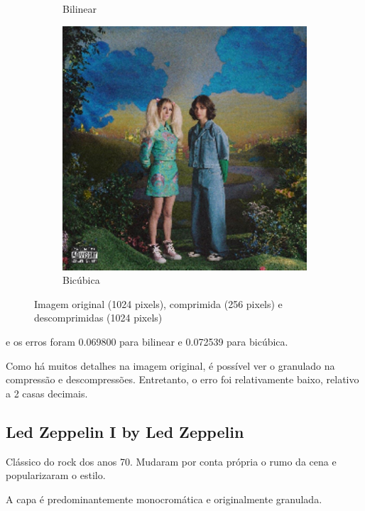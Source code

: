 \documentclass{article}
\begin{document}
\begin{figure}[ht]
\begin{subfigure}{0.48\textwidth}
    \caption{Bilinear}
  \end{subfigure}%
  \hfill
  \begin{subfigure}{0.48\textwidth}
    \centering
    \includegraphics[width=\textwidth]{imagens-reais/not-tight/decompressed-bicubica.png}
    \caption{Bicúbica}
  \end{subfigure}
  \caption{Imagem original (1024 pixels), comprimida (256 pixels) e descomprimidas (1024 pixels)}
\end{figure}

e os erros foram 0.069800 para bilinear e 0.072539 para bicúbica.

Como há muitos detalhes na imagem original, é possível ver o
granulado na compressão e descompressões. Entretanto, o erro foi
relativamente baixo, relativo a 2 casas decimais.

\subsection{Led Zeppelin I by Led Zeppelin}

Clássico do rock dos anos 70. Mudaram por conta própria o rumo da
cena e popularizaram o estilo.

A capa é predominantemente monocromática e originalmente granulada.
\end{document}
